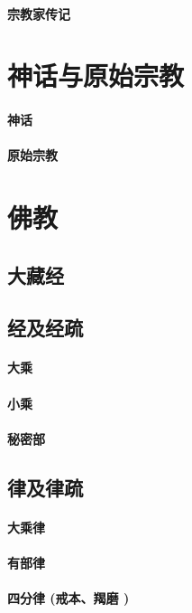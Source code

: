 \documentclass[UTF8]{../RepresentationUniverse}
\begin{document}
\subsubsection{宗教家传记}


\chapter{神话与原始宗教}
\subsubsection{神话}
\subsubsection{原始宗教}


\chapter{佛教}
\section{大藏经}
\section{经及经疏}
\subsubsection{大乘}
\subsubsection{小乘}
\subsubsection{秘密部}

\section{律及律疏}
\subsubsection{大乘律}
\subsubsection{有部律}
\subsubsection{四分律 (戒本、羯磨 )}
\end{document}
